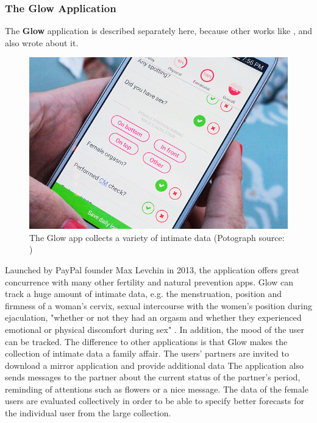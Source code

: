 \subsubsection{The Glow Application}
\label{subsubsec:glow_application}
The \textbf{Glow} application is described separately here, because other works like  \cite{doi:10.1080/15265161.2017.1409823}, \cite{levy2014intimate} and \cite{doi:10.1080/13691058.2014.920528} also wrote about it.
\begin{figure}[htb]
	\centering
	\includegraphics[width=\linewidth]{img/Glow-App-review-screenshot-1.jpg}
	\caption{The Glow app collects a variety of intimate data (Potograph source: \cite{glowApp})}
	\label{fig:glow_app}
\end{figure}
Launched by PayPal founder Max Levchin in 2013, the application offers great concurrence with many other fertility and natural prevention apps. Glow can track a huge amount of intimate data, e.g. the menstruation, position and firmness of a woman's cervix, sexual intercourse with the women's position during ejaculation, "whether or not they had an orgasm and whether they experienced emotional or physical discomfort during sex" \cite{doi:10.1080/13691058.2014.920528}. In addition, the mood of the user can be tracked.
The difference to other applications is that Glow makes the collection of intimate data a family affair. The users' partners are invited to download a mirror application and provide additional data \cite{levy2014intimate} The application also sends messages to the partner about the current status of the partner's period, reminding of attentions such as flowers or a nice message.
The data of the female users are evaluated collectively in order to be able to specify better forecasts for the individual user from the large collection.


